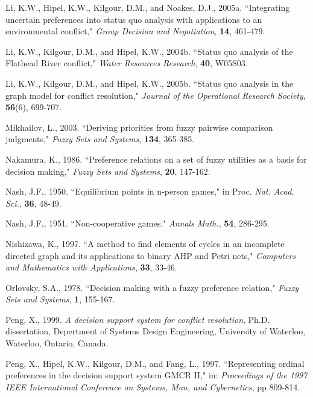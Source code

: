 \documentclass[letterpaper,12pt,titlepage,oneside,final]{book}
\begin{document}
\begin{thebibliography}{}
Li, K.W., Hipel, K.W., Kilgour, D.M., and Noakes, D.J., 2005a. ``Integrating uncertain preferences into status quo analysis with applications to an environmental conflict," {\em Group Decision and Negotiation}, {\bf 14}, 461-479.

Li, K.W., Kilgour, D.M., and Hipel, K.W., 2004b. ``Status quo analysis of the Flathead River conflict," {\em Water Resources Research}, {\bf 40}, W05S03.

Li, K.W., Kilgour, D.M., and Hipel, K.W., 2005b. ``Status quo analysis in the graph model for conflict resolution," {\em Journal of the Operational Research Society}, {\bf 56}(6), 699-707.

Mikhailov, L., 2003. ``Deriving priorities from fuzzy pairwise comparison judgments," \emph{Fuzzy Sets and Systems}, {\bf 134}, 365-385.

Nakamura, K., 1986. ``Preference relations on a set of fuzzy utilities as a basis for decision making," \emph{Fuzzy Sets and Systems}, {\bf 20}, 147-162.

Nash, J.F., 1950. ``Equilibrium points in n-person games," in Proc. \emph{Nat. Acad. Sci.}, {\bf 36}, 48-49.

Nash, J.F., 1951. ``Non-cooperative games," \emph{Annals Math.}, {\bf 54}, 286-295.

Nishizawa, K., 1997. ``A method to find elements of cycles in an incomplete directed graph and its applications to binary AHP and Petri nets," \emph{Computers and Mathematics with Applications}, {\bf 33}, 33-46.

Orlovsky, S.A., 1978. ``Decision making with a fuzzy preference relation," \emph{Fuzzy Sets and Systems}, {\bf 1}, 155-167.

Peng, X., 1999. \emph{A decision support system for conflict resolution}, Ph.D. dissertation, Depertment of Systems Design Engineering, University of Waterloo, Waterloo, Ontario, Canada.

Peng, X., Hipel, K.W., Kilgour, D.M., and Fang, L., 1997. ``Representing ordinal preferences in the decision support system GMCR II," in: \emph{Proceedings of the 1997 IEEE International Conference on Systems, Man, and Cybernetics}, pp 809-814.


\end{thebibliography}
\end{document}
